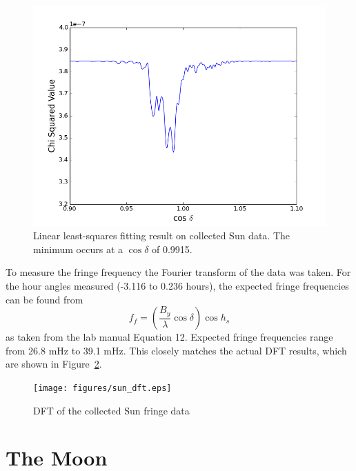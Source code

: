\documentclass[12pt]{article}
\begin{document}
\begin{figure}
\centering
\includegraphics[width=\linewidth]{figures/sun_fit.png}
\caption{Linear least-squares fitting result on collected Sun data. The minimum occurs at a $\cos \delta$ of 0.9915.}
\label{fig:sunfit}
\end{figure}

To measure the fringe frequency the Fourier transform of the data was taken.
For the hour angles measured (-3.116 to 0.236 hours), the expected fringe frequencies can be found from
\begin{equation}
f_f = \left( \frac{B_y}{\lambda} \cos \delta \right) \cos h_s
\end{equation}
as taken from the lab manual Equation 12.
Expected fringe frequencies range from 26.8 mHz to 39.1 mHz.
This closely matches the actual DFT results, which are shown in Figure~\ref{fig:sundft}.

\begin{figure}
\centering
\texttt{[image: figures/sun\_dft.eps]}
\caption{DFT of the collected Sun fringe data}
\label{fig:sundft}
\end{figure}

\section{The Moon}
\end{document}
